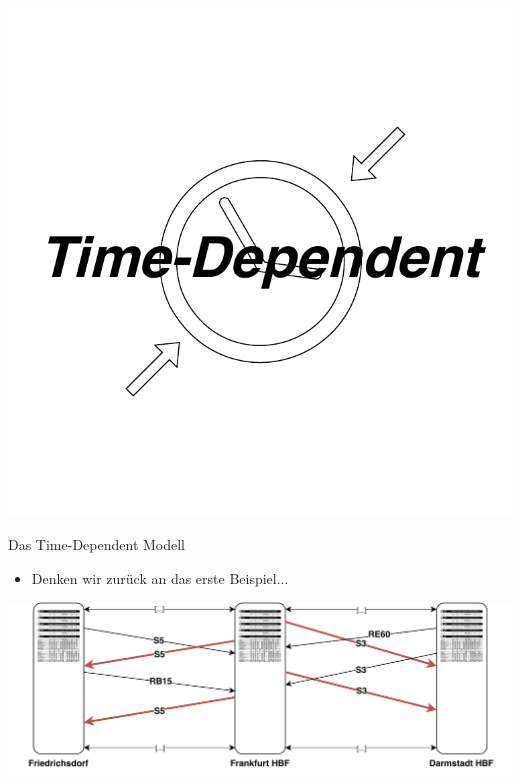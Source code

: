 \begin{frame}
	\vspace{-3em}
	\begin{center}
		\includegraphics[width=.78\linewidth]{images/time-dependent/title.pdf} 
	\end{center}
\end{frame}


\begin{frame}{Das Time-Dependent Modell}
	\begin{itemize}
		\item Denken wir zurück an das erste Beispiel...
	\end{itemize}

	\begin{center}
		\includegraphics[width=\linewidth]{images/simple-approach-timed-3.pdf}
	\end{center}
\end{frame}



